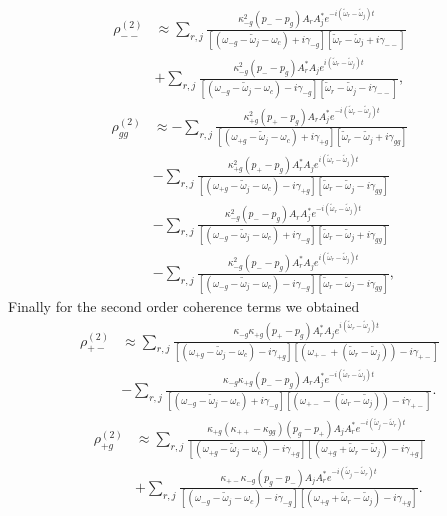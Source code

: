 \documentclass[preprint,secnumarabic,amssymb, nobibnotes, aip, prd]{revtex4-1}
\def\tw{\tilde{\omega}}
\def\tw{\tilde{\omega}}
\begin{document}
	\begin{align}
	\label{eq:rho_2_mm_solution_fin}
	\rho_{--}^{(2)} &\approx \sum_{r,j} \frac{\kappa_{-g}^2 (p_--p_g) A_rA_j^*e^{-i(\tw_r-\tw_j)t}}{[( \omega_{- g} - \tw_j-\omega_c) +i\gamma_{- g}][ \tw_r-\tw_j +i\gamma_{--}]} \nonumber \\
	& + \sum_{r,j} \frac{\kappa_{-g}^2 (p_--p_g) A_r^*A_je^{i(\tw_r-\tw_j)t}}{[( \omega_{- g} - \tw_j-\omega_c) -i\gamma_{- g}][ \tw_r-\tw_j -i\gamma_{--}]},
	\end{align}
	\begin{align}
		\label{eq:rho_2_gg_solution_fin}
		\rho_{gg}^{(2)} &\approx -\sum_{r,j} \frac{\kappa_{+g}^2 (p_+-p_g) A_rA_j^*e^{-i(\tw_r-\tw_j)t}}{[( \omega_{+ g} - \tw_j-\omega_c) +i\gamma_{+ g}][ \tw_r-\tw_j +i\gamma_{gg}]} \nonumber \\
		& - \sum_{r,j} \frac{\kappa_{+g}^2 (p_+-p_g) A_r^*A_je^{i(\tw_r-\tw_j)t}}{[( \omega_{+ g} - \tw_j-\omega_c) -i\gamma_{+ g}][ \tw_r-\tw_j -i\gamma_{gg}]} \nonumber \\
		 &-\sum_{r,j} \frac{\kappa_{-g}^2 (p_--p_g) A_rA_j^*e^{-i(\tw_r-\tw_j)t}}{[( \omega_{- g} - \tw_j-\omega_c) +i\gamma_{- g}][ \tw_r-\tw_j +i\gamma_{gg}]} \nonumber \\
		& - \sum_{r,j} \frac{\kappa_{-g}^2 (p_--p_g) A_r^*A_je^{i(\tw_r-\tw_j)t}}{[( \omega_{- g} - \tw_j-\omega_c) -i\gamma_{- g}][ \tw_r-\tw_j -i\gamma_{gg}]},
	\end{align}	
Finally for the  second order coherence terms we obtained
	\begin{align}
	\label{eq:rho_2_pm_solution_fin}
	\rho_{+-}^{(2)} &\approx \sum_{r,j}\frac{\kappa_{-g}\kappa_{+g}(p_+-p_g)A_r^*A_j e^{i(\tw_r-\tw_j)t}}{[( \omega_{+ g} - \tw_j-\omega_c) -i\gamma_{+ g}][( \omega_{+-} + (\tw_r-\tw_j))-i\gamma_{+-}]} \nonumber \\
	&-\sum_{r,j}\frac{\kappa_{-g}\kappa_{+g}(p_--p_g)A_rA_j^* e^{-i(\tw_r-\tw_j)t}}{[( \omega_{- g} - \tw_j-\omega_c) +i\gamma_{- g}][(\omega_{+-} - (\tw_r-\tw_j))-i\gamma_{+-}]}.
	\end{align}
	\begin{align}
	\label{eq:rho_2_+g_solution_fin}
	\rho_{+g}^{(2)} &\approx  \sum_{r,j} \frac{\kappa_{+g}(\kappa_{++}-\kappa_{gg})(p_g-p_+) A_j A_r^* e^{-i(\tw_j-\tw_r)t}}{[( \omega_{+ g} - \tw_j-\omega_c) -i\gamma_{+ g}][( \omega_{+ g} +\tw_r- \tw_j) -i\gamma_{+ g}]} \nonumber \\ 
	&+\sum_{r,j}\frac{\kappa_{+-}\kappa_{-g}(p_g-p_-) A_j A_r^* e^{-i(\tw_j-\tw_r)t}}{[( \omega_{-g} - \tw_j-\omega_c) -i\gamma_{-g}][( \omega_{+ g} +\tw_r- \tw_j) -i\gamma_{+ g}]}.
	\end{align}
\end{document}
